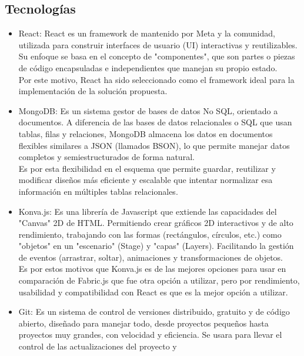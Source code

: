 \documentclass[12pt,oneside]{article}
\begin{document}
\subsection{Tecnologías}
\begin{itemize}
    \item React: React es un framework de mantenido por Meta y la comunidad, utilizada para construir interfaces de usuario (UI) interactivas y reutilizables. Su enfoque se basa en el concepto de "componentes", que son partes o piezas de código encapsuladas e independientes que manejan su propio estado.\\
    Por este motivo, React ha sido seleccionado como el framework ideal para la implementación de la solución propuesta.
    
    \item MongoDB: Es un sistema gestor de bases de datos No SQL, orientado a documentos. A diferencia de las bases de datos relacionales o SQL que usan tablas, filas y relaciones, MongoDB almacena los datos en documentos flexibles similares a JSON (llamados BSON), lo que permite manejar datos completos y semiestructurados de forma natural.\\
    Es por esta flexibilidad en el esquema que permite guardar, reutilizar y modificar diseños más eficiente y escalable que intentar normalizar esa información en múltiples tablas relacionales.
    
    \item Konva.js: Es una librería de Javascript que extiende las capacidades del "Canvas" 2D de HTML. Permitiendo crear gráficos 2D interactivos y de alto rendimiento, trabajando con las formas (rectángulos, círculos, etc.) como "objetos" en un "escenario" (Stage) y "capas" (Layers). Facilitando la gestión de eventos (arrastrar, soltar), animaciones y transformaciones de objetos.\\
    Es por estos motivos que Konva.js es de las mejores opciones para usar en comparación de Fabric.js que fue otra opción a utilizar, pero por rendimiento, usabilidad y compatibilidad con React es que es la mejor opción a utilizar.

    \item Git: Es un sistema de control de versiones distribuido, gratuito y de código abierto, diseñado para manejar todo, desde proyectos pequeños hasta proyectos muy grandes, con velocidad y eficiencia.
    Se usara para llevar el control de las actualizaciones del proyecto y 

 \end{itemize}
\end{document}
